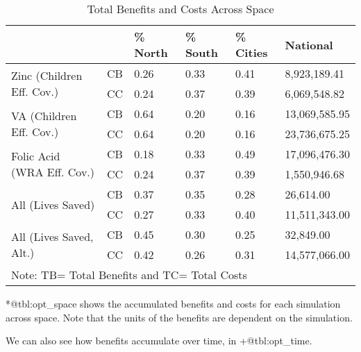 \documentclass[
]{article}
\begin{document}
\begin{table}
\centering
\caption{Total Benefits and Costs Across Space}
\label{tbl:opt_space}
\begin{tabular}{llllll}
\toprule
                        &    & \% North & \% South & \% Cities &       National \\
\midrule
\multirow{2}{*}{Zinc (Children Eff. Cov.)} & CB &    0.26 &    0.33 &     0.41 &   8,923,189.41 \\
                        & CC &    0.24 &    0.37 &     0.39 &   6,069,548.82 \\
\cline{1-6}
\multirow{2}{*}{VA (Children Eff. Cov.)} & CB &    0.64 &    0.20 &     0.16 &  13,069,585.95 \\
                        & CC &    0.64 &    0.20 &     0.16 &  23,736,675.25 \\
\cline{1-6}
\multirow{2}{*}{Folic Acid (WRA Eff. Cov.)} & CB &    0.18 &    0.33 &     0.49 &  17,096,476.30 \\
                        & CC &    0.24 &    0.37 &     0.39 &   1,550,946.68 \\
\cline{1-6}
\multirow{2}{*}{All (Lives Saved)} & CB &    0.37 &    0.35 &     0.28 &      26,614.00 \\
                        & CC &    0.27 &    0.33 &     0.40 &  11,511,343.00 \\
\cline{1-6}
\multirow{2}{*}{All (Lives Saved, Alt.)} & CB &    0.45 &    0.30 &     0.25 &      32,849.00 \\
                        & CC &    0.42 &    0.26 &     0.31 &  14,577,066.00 \\
\bottomrule
\multicolumn{6}{p{.8\textwidth}}{Note: TB= Total Benefits and TC= Total Costs}
\end{tabular}
\end{table}

*@tbl:opt\_space shows the accumulated benefits and costs for each
simulation across space. Note that the units of the benefits are
dependent on the simulation.

We can also see how benefits accumulate over time, in +@tbl:opt\_time.
\end{document}
